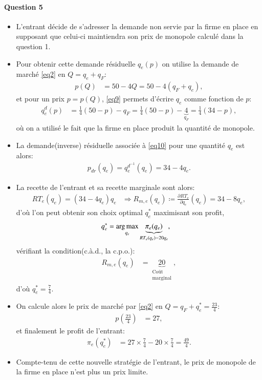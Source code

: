 \begin{frame}
  [allowframebreaks]{\insertsection}
  \framesubtitle{Question 5}
  \begin{itemize}
    \item L'entrant décide de s'adresser la demande non servie par la firme en place
    en supposant que celui-ci maintiendra son prix de monopole calculé dans la question 1. 
    \item Pour obtenir cette demande résiduelle $q_e(p)$ on utilise la demande de marché \eqref{eq2}
    en $Q = q_e+q_F$:
    \begin{align}
      p(Q) &= 50-4Q = 50-4(q_F + q_e),
      \label{eq9}
    \end{align}
    et pour un prix $p = p(Q)$, \eqref{eq9} permets d'écrire $q_e$ comme fonction de $p$:
    \begin{align}
      q_e^d(p) &= \frac{1}{4}(50-p) - q_F = \frac{1}{4}(50-p) - \underbrace{4}_{q_F} = \frac{1}{4}(34-p),
      \label{eq10}
    \end{align}
    où on a utilisé le fait que la firme en place produit la quantité de monopole.
    \item La demande(inverse) résiduelle associée à \eqref{eq10} pour une quantité $q_e$ est alors:
    \begin{align}
      p_{dr}(q_e) = q_e^{d^{-1}}(q_e) = 34-4q_e.
    \end{align}
    \item La recette de l'entrant et sa recette marginale sont alors:
    \begin{align*}
      RT_e(q_e) = (34-4q_e)q_e&\Rightarrow R_{m,e}(q_e) \coloneqq \frac{\partial RT_e}{\partial q_e}(q_e)
       = 34-8q_e, 
    \end{align*}
    d'où l'on peut obtenir son choix optimal $q_e^*$ maximisant son profit,
    \begin{align*}
      q_e^* &=\argmax_{q_e}\underbrace{\pi_e(q_e)}_{RT_e(q_e) - 20q_e},
    \end{align*}
    vérifiant la condition(c.à.d., la c.p.o.):
    \begin{align*}
      R_{m,e}(q_e) &= \underbrace{20}_{\substack{\text{Coût}\\\text{marginal}}},
    \end{align*}
    d'où $q_e^* = \frac{7}{4}$.
    \item On calcule alors le prix de marché par \eqref{eq2} en $Q = q_F + q_e^* = \frac{23}{4}$:
    \begin{align*}
      p\left(\frac{23}{4}\right) &= 27,
    \end{align*}
    et finalement le profit de l'entrant:
    \begin{align*}
      \pi_e(q_e^*) &=  27 \times \frac{7}{4} - 20 \times  \frac{7}{4} =  \frac{49}{4}.
    \end{align*}
    \item Compte-tenu de cette nouvelle stratégie de l’entrant, 
    le prix de monopole de la firme en place n’est plus un prix limite.
  \end{itemize}
\end{frame}  

